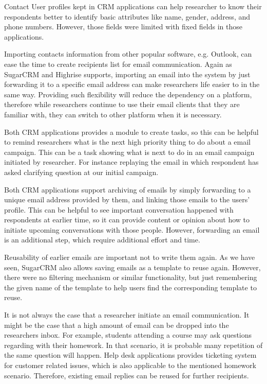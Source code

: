 \begin{compactitem}
	\item Contact User profiles kept in \ac{CRM} applications can help researcher to know their respondents better to identify basic attributes like name, gender, address, and phone numbers. However, those fields were limited with fixed fields in those applications.
	\item Importing contacts information from other popular software, e.g. Outlook, can ease the time to create recipients list for email communication. Again as SugarCRM and Highrise supports, importing an email into the system by just forwarding it to a specific email address can make researchers life easier to in the same way. Providing such flexibility will reduce the dependency on a platform, therefore while researchers continue to use their email clients that they are familiar with, they can switch to other platform when it is necessary.
	\item Both \ac{CRM} applications provides a module to create tasks, so this can be helpful to remind researchers what is the next high priority thing to do about a email campaign. This can be a task showing what is next to do in an email campaign initiated by researcher. For instance replaying the email in which respondent has asked clarifying question at our initial campaign.
	\item Both \ac{CRM} applications support archiving of emails by simply forwarding to a unique email address provided by them, and linking those emails to the users' profile. This can be helpful to see important conversation happened with respondents at earlier time, so it can provide content or opinion about how to initiate upcoming conversations with those people. However, forwarding an email is an additional step, which require additional effort and time.
	\item Reusability of earlier emails are important not to write them again. As we have seen, SugarCRM also allows saving emails as a template to reuse again. However, there were no filtering mechanism or similar functionality, but just remembering the given name of the template to help users find the corresponding template to reuse.
	\item It is not always the case that a researcher initiate an email communication. It might be the case that a high amount of email can be dropped into the researchers inbox. For example, students attending a course may ask questions regarding with their homework. In that scenario, it is probable many repetition of the same question will happen. Help desk applications provides ticketing system for customer related issues, which is also applicable to the mentioned homework scenario. Therefore, existing email replies can be reused for further recipients.

\end{compactitem}
